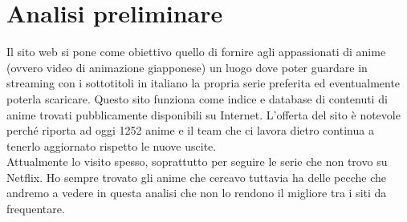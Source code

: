 \section{Analisi preliminare}
Il sito web \nomeSito si pone come obiettivo quello di fornire agli appassionati di anime (ovvero video di animazione giapponese) un luogo dove poter guardare in streaming con i sottotitoli in italiano la propria serie preferita ed eventualmente poterla scaricare. Questo sito funziona come indice e database di contenuti di anime trovati pubblicamente disponibili su Internet. L'offerta del sito è notevole perché riporta ad oggi 1252 anime e il team che ci lavora dietro continua a tenerlo aggiornato rispetto le nuove uscite. \\
Attualmente lo visito spesso, soprattutto per seguire le serie che non trovo su Netflix. Ho sempre trovato gli anime che cercavo tuttavia ha delle pecche che andremo a vedere in questa analisi che non lo rendono il migliore tra i siti da frequentare.
